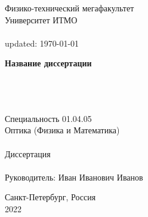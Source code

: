 \thispagestyle{empty}


\vspace{0pt plus2fill} %
\begin{center}
	Физико-технический мегафакультет \\
	Университет ИТМО \\ \ \\
	{\tiny updated: \today} 
\end{center}

\vspace*{230pt}
\begin{center}
\textbf {\large %
Название диссертации
} \\ \ \\ \
{\large 
	}
 \\ \ 

Специальность 01.04.05\\
Оптика (Физика и Математика) \\ \ \\
Диссертация \\ \ \\ 
Руководитель: Иван Иванович Иванов
\end{center}

\vspace{0pt plus2fill} %

\begin{center}
	Санкт-Петербург, Россия\\
	2022
\end{center}


